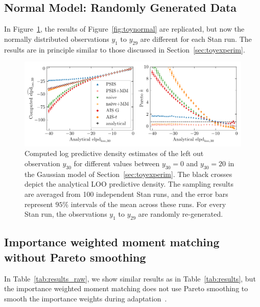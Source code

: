 \documentclass[12pt]{article}
\begin{document}
\begin{appendices}
\subsection{Normal Model: Randomly Generated Data}

In Figure~\ref{fig:toynormal_randomized}, the results of Figure~\ref{fig:toynormal}
are replicated, but now the normally distributed observations $y_{1}$ to $y_{29}$
are different for each Stan run. The results are in principle similar to those discussed in
Section~\ref{sec:toyexperim}.


\begin{figure}[t]
\centering
\includegraphics[width=\textwidth]{figs/normaldata_mm_ais2_comb_randomized.pdf}
%
\caption{Computed log predictive density estimates of the left out observation $y_{30}$
for different values between $y_{30} = 0$ and $y_{30} = 20$ in the Gaussian model of Section~\ref{sec:toyexperim}.
The black crosses depict the analytical LOO predictive density. The sampling results are averaged from 100 independent Stan runs, and the error bars represent $95 \%$
intervals of the mean across these runs. For every Stan run, the observations $y_{1}$ to $y_{29}$
are randomly re-generated.} \label{fig:toynormal_randomized}
\end{figure}


\subsection{Importance weighted moment matching without Pareto smoothing}

In Table~\ref{tab:results_raw}, we show
similar results as in Table~\ref{tab:results}, but
the importance weighted moment matching does not use Pareto smoothing to
smooth the importance weights during adaptation~\citep{vehtari2015pareto}.



\end{appendices}
\end{document}
